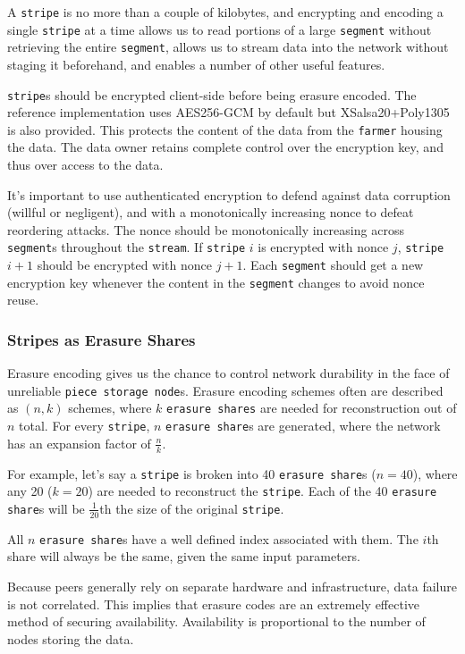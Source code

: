 \documentclass[a4paper,10pt]{article}
\newcommand{\x}[1]{{\tt #1}}
\begin{document}
A \x{stripe} is no more than a couple of kilobytes, and encrypting and encoding
a single \x{stripe} at a time allows us to read portions of a large \x{segment}
without retrieving the entire \x{segment}, allows us to stream data into the
network without staging it beforehand, and enables a number of other useful
features.

\x{stripe}s should be encrypted client-side before being erasure encoded. The
reference implementation uses AES256-GCM by default but XSalsa20+Poly1305 is
also provided. This protects the content of the data from the \x{farmer} housing
the data. The data owner retains complete control over the encryption key, and
thus over access to the data.

It's important to use authenticated encryption to defend against data
corruption (willful or negligent), and with a monotonically increasing
nonce to defeat reordering attacks. The nonce should be monotonically increasing
across \x{segment}s throughout the \x{stream}. If \x{stripe} $i$ is encrypted
with nonce $j$, \x{stripe} $i+1$ should be encrypted with nonce $j+1$. Each
\x{segment} should get a new encryption key whenever the content in the
\x{segment} changes to avoid nonce reuse.

\subsubsection{Stripes as Erasure Shares}

Erasure encoding gives us the chance to control network durability in the face
of unreliable \x{piece storage node}s. Erasure encoding schemes often are
described as $(n, k)$ schemes, where $k$ \x{erasure shares} are needed for
reconstruction out of $n$ total. For every \x{stripe}, $n$ \x{erasure share}s
are generated, where the network has an expansion factor of $\frac{n}{k}$.

For example, let's say a \x{stripe} is broken into 40 \x{erasure share}s
($n=40$), where any 20 ($k=20$) are needed to reconstruct the \x{stripe}. Each
of the 40 \x{erasure share}s will be $\frac{1}{20}$th the size of the original
\x{stripe}.

All $n$ \x{erasure share}s have a well defined index associated with them. The
$i$th share will always be the same, given the same input parameters.

Because peers generally rely on separate hardware and infrastructure, data
failure is not correlated. This implies that erasure codes are an extremely
effective method of securing availability. Availability is proportional to the
number of nodes storing the data.
\end{document}
